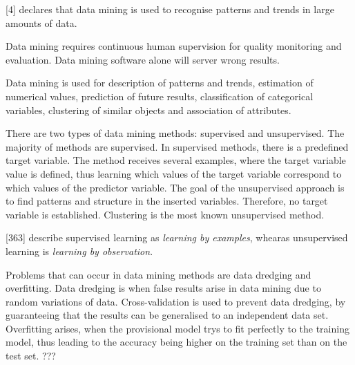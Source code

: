 \textcite{DataMiningAndPredictiveAnalytics}[4] declares that data mining is used to recognise patterns and trends in large amounts of data.

Data mining requires continuous human supervision for quality monitoring and evaluation. Data mining software alone will server wrong results.

Data mining is used for description of patterns and trends, estimation of numerical values, prediction of future results, classification of categorical variables, clustering of similar objects and association of attributes.


There are two types of data mining methods: supervised and unsupervised.
The majority of methods are supervised. In supervised methods, there is a predefined target variable. The method receives several examples, where the target variable value is defined, thus learning which values of the target variable correspond to which values of the predictor variable.
The goal of the unsupervised approach is to find patterns and structure in the inserted variables. Therefore, no target variable is established. Clustering is the most known unsupervised method.

\textcite{han2011data}[363] describe supervised learning as \textit{learning by examples}, whearas unsupervised learning is \textit{learning by observation}.

Problems that can occur in data mining methods are data dredging and overfitting. Data dredging is when false results arise in data mining due to random variations of data. Cross-validation is used to prevent data dredging, by guaranteeing that the results can be generalised to an independent data set. %
Overfitting arises, when the provisional model trys to fit perfectly to the training model, thus leading to the accuracy being higher on the training set than on the test set. ???

